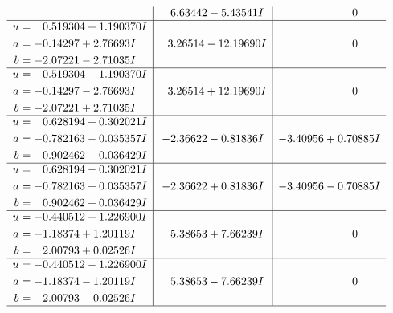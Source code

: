 \documentclass[1p]{elsarticle_modified}
\theoremstyle{definition}
\begin{document}
$$\begin{array}{c|c|c}
 & \phantom{-}6.63442 - 5.43541 I & \phantom{-0.000000 } 0 \\ \hline\begin{aligned}
u &= \phantom{-}0.519304 + 1.190370 I \\
a &= -0.14297 + 2.76693 I \\
b &= -2.07221 - 2.71035 I\end{aligned}
 & \phantom{-}3.26514 - 12.19690 I & \phantom{-0.000000 } 0 \\ \hline\begin{aligned}
u &= \phantom{-}0.519304 - 1.190370 I \\
a &= -0.14297 - 2.76693 I \\
b &= -2.07221 + 2.71035 I\end{aligned}
 & \phantom{-}3.26514 + 12.19690 I & \phantom{-0.000000 } 0 \\ \hline\begin{aligned}
u &= \phantom{-}0.628194 + 0.302021 I \\
a &= -0.782163 - 0.035357 I \\
b &= \phantom{-}0.902462 - 0.036429 I\end{aligned}
 & -2.36622 - 0.81836 I & -3.40956 + 0.70885 I \\ \hline\begin{aligned}
u &= \phantom{-}0.628194 - 0.302021 I \\
a &= -0.782163 + 0.035357 I \\
b &= \phantom{-}0.902462 + 0.036429 I\end{aligned}
 & -2.36622 + 0.81836 I & -3.40956 - 0.70885 I \\ \hline\begin{aligned}
u &= -0.440512 + 1.226900 I \\
a &= -1.18374 + 1.20119 I \\
b &= \phantom{-}2.00793 + 0.02526 I\end{aligned}
 & \phantom{-}5.38653 + 7.66239 I & \phantom{-0.000000 } 0 \\ \hline\begin{aligned}
u &= -0.440512 - 1.226900 I \\
a &= -1.18374 - 1.20119 I \\
b &= \phantom{-}2.00793 - 0.02526 I\end{aligned}
 & \phantom{-}5.38653 - 7.66239 I & \phantom{-0.000000 } 0\\
 \hline 
 \end{array}$$\newpage$$\begin{array}{c|c|c}  

\end{array}$$
\end{document}

